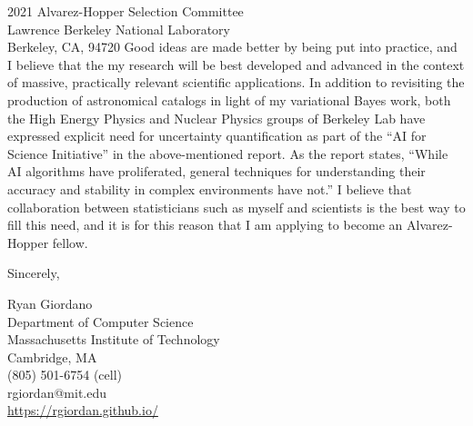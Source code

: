 \documentclass{letter}
\begin{document}
\begin{letter}{2021 Alvarez-Hopper Selection Committee\\
Lawrence Berkeley National Laboratory\\
Berkeley, CA, 94720}
Good ideas are made better by being put into practice, and I believe that the my
research will be best developed and advanced in the context of massive,
practically relevant scientific applications.  In addition to revisiting the
production of astronomical catalogs in light of my variational Bayes work, both
the High Energy Physics and Nuclear Physics groups of Berkeley Lab have
expressed explicit need for uncertainty quantification as part of the ``AI for
Science Initiative'' in the above-mentioned report.  As the report states,
``While  AI algorithms have proliferated,  general  techniques  for
understanding  their accuracy  and stability in complex environments have not.''
I believe that collaboration between statisticians such as myself and scientists
is the best way to fill this need, and it is for this reason that I am applying
to become an Alvarez-Hopper fellow.


\closing{Sincerely,}

Ryan Giordano\\
Department of Computer Science\\
Massachusetts Institute of Technology\\
Cambridge, MA\\
(805) 501-6754 (cell)\\
rgiordan@mit.edu\\
\url{https://rgiordan.github.io/}
\end{letter}

% 
% 
\end{document}
